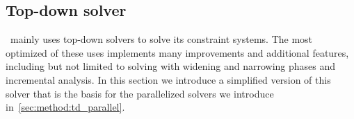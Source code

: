   \subsection{Top-down solver}
  \label{sec:background:td}
  \gob\ mainly uses top-down solvers to solve its constraint systems. The most optimized of these uses implements many improvements and additional features, including but not limited to solving with widening and narrowing phases and incremental analysis. 
  In this section we introduce a simplified version of this solver that is the basis for the parallelized solvers we introduce in~\autoref{sec:method:td_parallel}.
